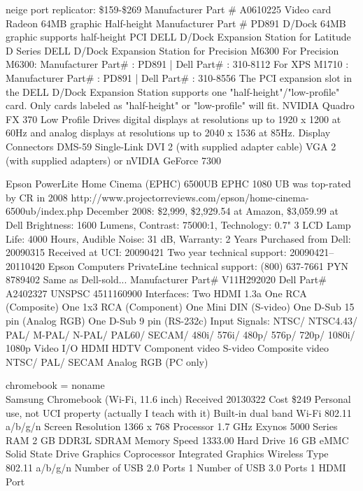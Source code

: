 \documentclass[12pt,twoside]{article}
\begin{document}
neige port replicator: \$159-\$269
Manufacturer Part \# A0610225 Video card Radeon 64MB graphic Half-height 
Manufacturer Part \# PD891 D/Dock 64MB graphic supports half-height PCI
DELL D/Dock Expansion Station for Latitude D Series
DELL D/Dock Expansion Station for Precision M6300
For Precision M6300: Manufacturer Part\# : PD891 | Dell Part\# : 310-8112
For XPS M1710      : Manufacturer Part\# : PD891 | Dell Part\# : 310-8556
The PCI expansion slot in the DELL D/Dock Expansion Station 
supports one "half-height"/"low-profile" card. 
Only cards labeled as "half-height" or "low-profile" will fit.
NVIDIA Quadro FX 370 Low Profile
Drives digital displays at resolutions up to 1920 x 1200 at 60Hz and
analog displays at resolutions up to 2040 x 1536 at 85Hz. 
Display Connectors 	DMS-59
Single-Link DVI 	2 (with supplied adapter cable)
VGA 	2 (with supplied adapters)
or nVIDIA GeForce 7300

Epson PowerLite Home Cinema (EPHC) 6500UB
EPHC 1080 UB was top-rated by CR in 2008
http://www.projectorreviews.com/epson/home-cinema-6500ub/index.php
December 2008: \$2,999, \$2,929.54 at Amazon, \$3,059.99 at Dell
Brightness: 1600 Lumens, Contrast: 75000:1, Technology: 0.7" 3 LCD
Lamp Life: 4000 Hours, Audible Noise: 31 dB, Warranty: 2 Years
Purchased from Dell: 20090315
Received at UCI: 20090421
Two year technical support: 20090421--20110420
Epson Computers PrivateLine technical support: (800) 637-7661 PYN 8789402
Same as Dell-sold...
Manufacturer Part\# V11H292020
Dell Part\# A2402327
UNSPSC 4511160900
Interfaces:
Two HDMI 1.3a
One RCA (Composite)
One 1x3 RCA (Component)
One Mini DIN (S-video)
One D-Sub 15 pin (Analog RGB)
One D-Sub 9 pin (RS-232c)
Input Signals:
NTSC/ NTSC4.43/ PAL/ M-PAL/ N-PAL/ PAL60/ SECAM/ 480i/ 576i/ 480p/ 576p/ 720p/ 1080i/ 1080p
Video I/O
HDMI
HDTV
Component video
S-video
Composite video
NTSC/ PAL/ SECAM
Analog RGB (PC only)

chromebook = noname \\
Samsung Chromebook (Wi-Fi, 11.6 inch)
Received 20130322
Cost \$249
Personal use, not UCI property (actually I teach with it)
Built-in dual band Wi-Fi 802.11 a/b/g/n
Screen Resolution	1366 x 768
Processor	1.7 GHz Exynos 5000 Series
RAM	2 GB DDR3L SDRAM
Memory Speed	1333.00
Hard Drive	16 GB eMMC Solid State Drive
Graphics Coprocessor	Integrated Graphics
Wireless Type	802.11 a/b/g/n
Number of USB 2.0 Ports	1
Number of USB 3.0 Ports	1
HDMI Port
\end{document}
